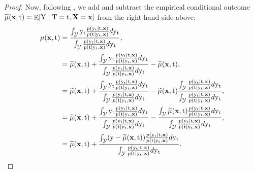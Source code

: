 \begin{lemma}
\begin{proof}
        Now, following \cite{jesson2021quantifying}, we add and subtract the empirical conditional outcome $\mut(\x, \tf) = \E[\Y \mid \Tf=\tf, \X=\x]$ from the right-hand-side above:
        \begin{subequations}
            \begin{align}
                \mu(\x, \tf)
                &= \frac{\int_{\Ycal} \yt \frac{p(\yt \mid \tf, \x)}{p(\tf \mid \yt, \x)}d\yt}{\int_{\Ycal} \frac{p(\yt \mid \tf, \x)}{p(\tf \mid \yt, \x)}d\yt}, \\
                &= \mut(\x, \tf) + \frac{\int_{\Ycal} \yt \frac{p(\yt \mid \tf, \x)}{p(\tf \mid \yt, \x)}d\yt}{\int_{\Ycal} \frac{p(\yt \mid \tf, \x)}{p(\tf \mid \yt, \x)}d\yt} - \mut(\x, \tf), \\
                &= \mut(\x, \tf) + \frac{\int_{\Ycal} \yt \frac{p(\yt \mid \tf, \x)}{p(\tf \mid \yt, \x)}d\yt}{\int_{\Ycal} \frac{p(\yt \mid \tf, \x)}{p(\tf \mid \yt, \x)}d\yt} - \mut(\x, \tf) \frac{\int_{\Ycal} \frac{p(\yt \mid \tf, \x)}{p(\tf \mid \yt, \x)}d\yt}{\int_{\Ycal} \frac{p(\yt \mid \tf, \x)}{p(\tf \mid \yt, \x)}d\yt}, \\
                &= \mut(\x, \tf) + \frac{\int_{\Ycal} \yt \frac{p(\yt \mid \tf, \x)}{p(\tf \mid \yt, \x)}d\yt}{\int_{\Ycal} \frac{p(\yt \mid \tf, \x)}{p(\tf \mid \yt, \x)}d\yt} -  \frac{\int_{\Ycal} \mut(\x, \tf) \frac{p(\yt \mid \tf, \x)}{p(\tf \mid \yt, \x)}d\yt}{\int_{\Ycal} \frac{p(\yt \mid \tf, \x)}{p(\tf \mid \yt, \x)}d\yt}, \\
                &= \mut(\x, \tf) + \frac{\int_{\Ycal} (\y - \mut(\x, \tf)) \frac{p(\yt \mid \tf, \x)}{p(\tf \mid \yt, \x)}d\yt}{\int_{\Ycal} \frac{p(\yt \mid \tf, \x)}{p(\tf \mid \yt, \x)}d\yt}.
            \end{align}
        \end{subequations}
        

\end{proof}
\end{lemma}
